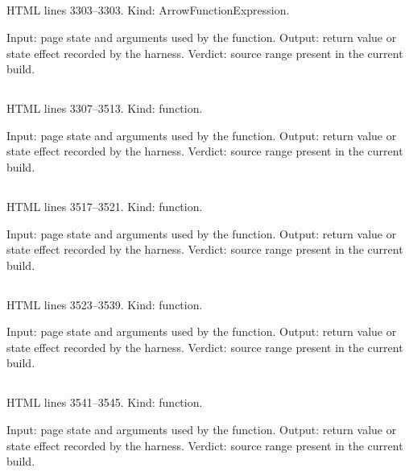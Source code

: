 \subsection*{\texttt{}}
\label{vf_110_flagName}
HTML lines 3303--3303. Kind: ArrowFunctionExpression.

Input: page state and arguments used by the function.
Output: return value or state effect recorded by the harness.
Verdict: source range present in the current build.

\subsection*{\texttt{}}
\label{vf_111_parseEds}
HTML lines 3307--3513. Kind: function.

Input: page state and arguments used by the function.
Output: return value or state effect recorded by the harness.
Verdict: source range present in the current build.

\subsection*{\texttt{}}
\label{vf_112_recalcCt}
HTML lines 3517--3521. Kind: function.

Input: page state and arguments used by the function.
Output: return value or state effect recorded by the harness.
Verdict: source range present in the current build.

\subsection*{\texttt{}}
\label{vf_113_parseLog}
HTML lines 3523--3539. Kind: function.

Input: page state and arguments used by the function.
Output: return value or state effect recorded by the harness.
Verdict: source range present in the current build.

\subsection*{\texttt{}}
\label{vf_114_studyRows}
HTML lines 3541--3545. Kind: function.

Input: page state and arguments used by the function.
Output: return value or state effect recorded by the harness.
Verdict: source range present in the current build.

